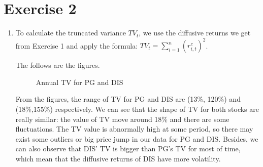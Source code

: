 \documentclass[12pt,letterpaper]{article}
\begin{document}
\section*{Exercise 2}
  \begin{enumerate}[label=\textbf{(\Alph*)}]
\item
To calculate the truncated variance $TV_t$, we use the diffusive returns we get from Exercise 1 and apply the formula: $TV_t=\sum_{i=1}^{n}(r_{i,t}^c)^2$. 

The follows are the figures.
 \begin{figure}[H]
            \centering
            \caption{Annual TV for PG and DIS}
\end{figure}

From the figures, the range of TV for PG and DIS are (13\%, 120\%) and (18\%,155\%) respectively. We can see that the shape of TV for both stocks are really similar: the value of TV move around 18\% and there are some fluctuations. The TV value is abnormally high at some period, so there may exist some outliers or big price jump in our data for PG and DIS. Besides, we can also observe that DIS' TV is bigger than PG's TV for most of time, which mean that the diffusive returns of DIS have more volatility.\\


\end{enumerate}
\end{document}
